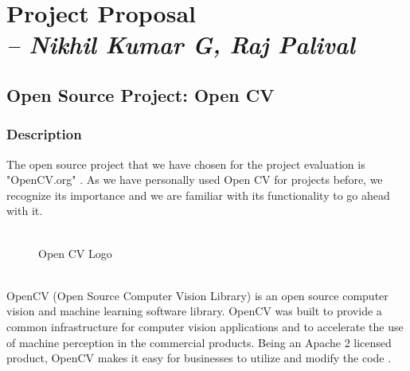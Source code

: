 \chapter{Project Proposal\\
\small{\textit{-- Nikhil Kumar G, Raj Palival}}
\label{Chapter::Project Proposal}}

\section{Open Source Project: Open CV \label{Section::chp2OpenCV}}
\subsection{Description}
The open source project that we have chosen for the project evaluation is "OpenCV.org" \cite{OCV}.
As we have personally used Open CV for projects before, we recognize its importance and we are familiar with its functionality to go ahead with it.\\ 
\\
\begin{figure}[ht]
\centering
{}
\caption{\label{Figure::OpenCVlogo} Open CV Logo}
\end{figure}
\\
OpenCV (Open Source Computer Vision Library) is an open source computer vision and machine learning software library. OpenCV was built to provide a common infrastructure for computer vision applications and to accelerate the use of machine perception in the commercial products. Being an Apache 2 licensed product, OpenCV makes it easy for businesses to utilize and modify the code \cite{6240859}. 